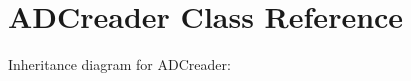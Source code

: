\hypertarget{classADCreader}{}\section{A\+D\+Creader Class Reference}
\label{classADCreader}


Inheritance diagram for A\+D\+Creader\+:
